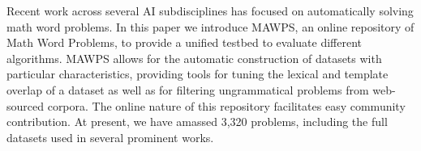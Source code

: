 Recent work across several AI subdisciplines has focused on automatically solving math word problems.  In this paper we introduce MAWPS, an online repository of Math Word Problems, to provide a unified testbed to evaluate different algorithms. MAWPS allows for the automatic construction of datasets with particular characteristics, providing tools for tuning the lexical and template overlap of a dataset as well as for filtering ungrammatical problems from web-sourced corpora. The online nature of this repository facilitates easy community contribution. At present, we have amassed 3,320 problems, including the full datasets used in several prominent works.
